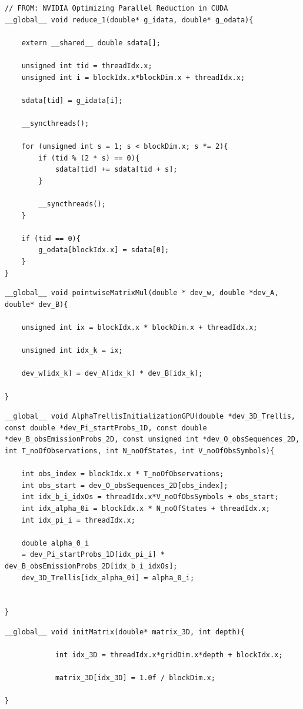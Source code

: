 \documentclass[english, paper=a4]{scrartcl}
\begin{document}
\begin{verbatim}
// FROM: NVIDIA Optimizing Parallel Reduction in CUDA
__global__ void reduce_1(double* g_idata, double* g_odata){

	extern __shared__ double sdata[];

	unsigned int tid = threadIdx.x;
	unsigned int i = blockIdx.x*blockDim.x + threadIdx.x;

	sdata[tid] = g_idata[i];

	__syncthreads();

	for (unsigned int s = 1; s < blockDim.x; s *= 2){
		if (tid % (2 * s) == 0){
			sdata[tid] += sdata[tid + s];
		}

		__syncthreads();
	}

	if (tid == 0){
		g_odata[blockIdx.x] = sdata[0];
	}
}
\end{verbatim}

\begin{verbatim}
__global__ void pointwiseMatrixMul(double * dev_w, double *dev_A, double* dev_B){

	unsigned int ix = blockIdx.x * blockDim.x + threadIdx.x;

	unsigned int idx_k = ix;

	dev_w[idx_k] = dev_A[idx_k] * dev_B[idx_k];

}
\end{verbatim}

\begin{verbatim}
__global__ void AlphaTrellisInitializationGPU(double *dev_3D_Trellis, const double *dev_Pi_startProbs_1D, const double *dev_B_obsEmissionProbs_2D, const unsigned int *dev_O_obsSequences_2D, int T_noOfObservations, int N_noOfStates, int V_noOfObsSymbols){

	int obs_index = blockIdx.x * T_noOfObservations;
	int obs_start = dev_O_obsSequences_2D[obs_index];
	int idx_b_i_idxOs = threadIdx.x*V_noOfObsSymbols + obs_start;
	int idx_alpha_0i = blockIdx.x * N_noOfStates + threadIdx.x;
	int idx_pi_i = threadIdx.x;

	double alpha_0_i 
	= dev_Pi_startProbs_1D[idx_pi_i] * dev_B_obsEmissionProbs_2D[idx_b_i_idxOs];
	dev_3D_Trellis[idx_alpha_0i] = alpha_0_i;


}
\end{verbatim}

\begin{verbatim}
__global__ void initMatrix(double* matrix_3D, int depth){

			int idx_3D = threadIdx.x*gridDim.x*depth + blockIdx.x;

			matrix_3D[idx_3D] = 1.0f / blockDim.x;

}
\end{verbatim}
\end{document}
